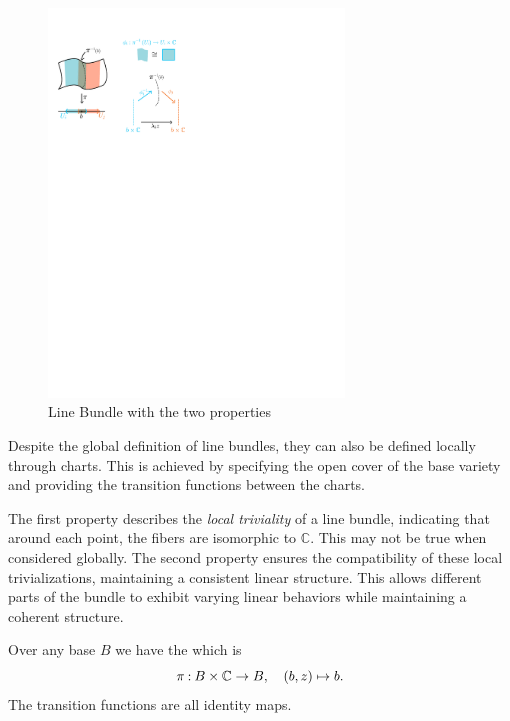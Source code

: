 \documentclass[12pt]{memoir}
\begin{document}
    \begin{figure}[h!]
        \centering
        \includegraphics[width=0.7\textwidth, trim= 0.725cm 19.25cm 11.625cm 2.25cm,clip]{../figs/figLineBundleDefn.pdf}
        \caption{Line Bundle with the two properties}
        \label{fig:1-LineBdlExample}
    \end{figure} 

    \begin{Rmk}
        Despite the global definition of line bundles, they can also be defined locally through charts. This is achieved by specifying the open cover of the base variety and providing the transition functions between the charts.
    \end{Rmk}
    
    \begin{Rmk}
        The first property describes the \emph{local triviality} of a line bundle, indicating that around each point, the fibers are isomorphic to $\mathbb{C}$. This may not be true when considered globally. The second property ensures the compatibility of these local trivializations, maintaining a consistent linear structure. This allows different parts of the bundle to exhibit varying linear behaviors while maintaining a coherent structure.
    \end{Rmk}

    \begin{Ex}
    Over any base $B$ we have the  which is 
    $$\pi\mathbin{:} B\times\mathbb{C}\to B,\quad (b,z)\mapsto b.$$
    The transition functions are all identity maps.
    \end{Ex} 
\end{document}
